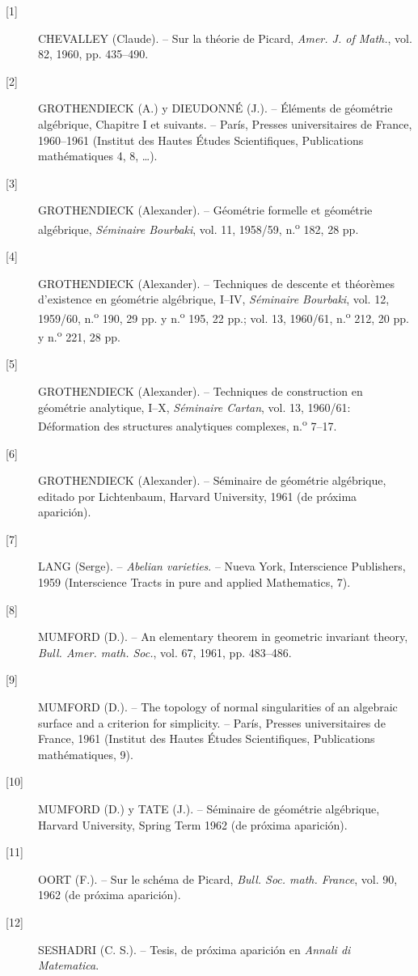 \documentclass[11pt,twoside,openany]{book}
\numberwithin{equation}{section}
\theoremstyle{plain}
\theoremstyle{definition}
\theoremstyle{remark}
\theoremstyle{plain}
\theoremstyle{definition}
\theoremstyle{remark}
\begin{document}
\begin{description}
\item[{[1]}] CHEVALLEY (Claude). -- Sur la théorie de Picard,
\emph{Amer. J. of Math.}, vol. 82, 1960, pp. 435--490.

\item[{[2]}] GROTHENDIECK (A.) y DIEUDONNÉ (J.). -- Éléments de géométrie
algébrique, Chapitre I et suivants. -- París, Presses universitaires de France,
1960--1961 (Institut des Hautes Études Scientifiques, Publications
mathématiques 4, 8, \ldots).

\item[{[3]}] GROTHENDIECK (Alexander). -- Géométrie formelle et géométrie
algébrique, \emph{Séminaire Bourbaki}, vol. 11, 1958/59,
n.\textsuperscript{o} 182, 28 pp.

\item[{[4]}] GROTHENDIECK (Alexander). -- Techniques de descente et théorèmes
d'existence en géométrie algébrique, I--IV, \emph{Séminaire Bourbaki}, vol. 12,
1959/60, n.\textsuperscript{o} 190, 29 pp. y n.\textsuperscript{o} 195, 22 pp.;
vol. 13, 1960/61, n.\textsuperscript{o} 212, 20 pp. y
n.\textsuperscript{o} 221, 28 pp.

\item[{[5]}] GROTHENDIECK (Alexander). -- Techniques de construction en
géométrie analytique, I--X, \emph{Séminaire Cartan}, vol. 13, 1960/61:
Déformation des structures analytiques complexes,
n.\textsuperscript{o} 7--17.

\item[{[6]}] GROTHENDIECK (Alexander). -- Séminaire de géométrie algébrique,
editado por Lichtenbaum, Harvard University, 1961 (de próxima aparición).

\item[{[7]}] LANG (Serge). -- \emph{Abelian varieties}. -- Nueva York,
Interscience Publishers, 1959 (Interscience Tracts in pure and applied
Mathematics, 7).

\item[{[8]}] MUMFORD (D.). -- An elementary theorem in geometric invariant
theory, \emph{Bull. Amer. math. Soc.}, vol. 67, 1961, pp. 483--486.

\item[{[9]}] MUMFORD (D.). -- The topology of normal singularities of an
algebraic surface and a criterion for simplicity. -- París, Presses
universitaires de France, 1961 (Institut des Hautes Études Scientifiques,
Publications mathématiques, 9).

\item[{[10]}] MUMFORD (D.) y TATE (J.). -- Séminaire de géométrie algébrique,
Harvard University, Spring Term 1962 (de próxima aparición).

\item[{[11]}] OORT (F.). -- Sur le schéma de Picard,
\emph{Bull. Soc. math. France}, vol. 90, 1962 (de próxima aparición).

\item[{[12]}] SESHADRI (C. S.). -- Tesis, de próxima aparición en
\emph{Annali di Matematica}.
\end{description}
\end{document}
